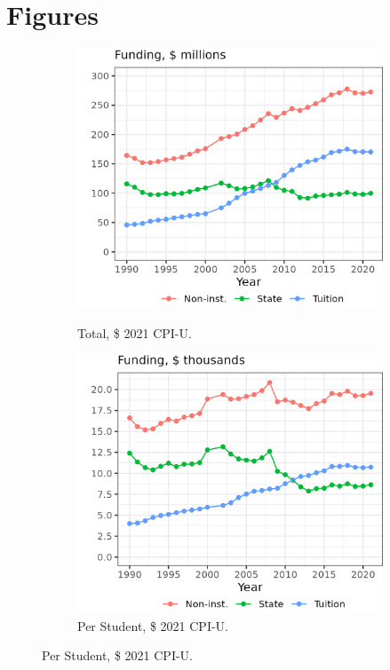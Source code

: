 \section{Figures}
\label{sec:figures}

\begin{figure}[H]
    \centering
    \singlespacing
    \caption{Mean Total Funding among Public Universities, by Year.}
    \begin{subfigure}[b]{0.495\textwidth}
        \centering
        \caption{Total, \$ 2021 CPI-U.}
        \includegraphics[width=\textwidth]{figures/mean-funding-total.png}
        \label{fig:mean-funding-total}
    \end{subfigure}
    \begin{subfigure}[b]{0.495\textwidth}
        \centering
        \caption{Per Student, \$ 2021 CPI-U.}
        \includegraphics[width=\textwidth]{figures/mean-funding-fte.png}

\end{subfigure}
\end{figure}
